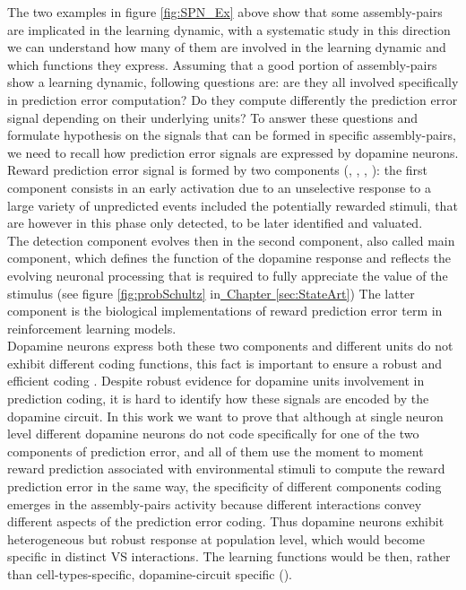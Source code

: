The two examples in figure \ref{fig:SPN_Ex} above show that some assembly-pairs are implicated in the learning dynamic, with a systematic study in this direction we can understand how many of them are involved in the learning dynamic and which functions they express. Assuming that a good portion of assembly-pairs show a learning dynamic, following questions are: are they all involved specifically in prediction error computation? Do they compute differently the prediction error signal depending on their underlying units? To answer these questions and formulate hypothesis on the signals that can be formed in specific assembly-pairs, we need to recall how prediction error signals are expressed by dopamine neurons. Reward prediction error signal is formed by two components (\cite{Tobler2003}, \cite{Nomoto2010}, \cite{Fiorillo2013}, \cite{Schultz2016}): the first component consists in an early activation due to an unselective response to a large variety of unpredicted events included the potentially rewarded stimuli, that are however in this phase only detected, to be later identified and valuated.\\The detection component evolves then in the second component, also called main component, which defines the function of the dopamine response and reflects the evolving neuronal processing that is required to fully appreciate the value of the stimulus (see figure \ref{fig:probSchultz} in\hyperref[sec:StateArt]{~Chapter \ref*{sec:StateArt}}) The latter component is the biological implementations of reward prediction error term in reinforcement learning models.\\
Dopamine neurons express both these two components and different units do not exhibit different coding functions, this fact is important to ensure a robust and efficient coding \cite{UchidaDop}. Despite robust evidence for dopamine units involvement in prediction coding, it is hard to identify how these signals are encoded by the dopamine circuit. In this work we want to prove that although at single neuron level different dopamine neurons do not code specifically for one of the two components of prediction error, and all of them use the moment to moment reward prediction associated with environmental stimuli to compute the reward prediction error in the same way, the specificity of different components coding emerges in the assembly-pairs activity because different interactions convey different aspects of the prediction error coding. Thus dopamine neurons exhibit heterogeneous but robust response at population level, which would become specific in distinct VS interactions. The learning functions would be then, rather than cell-types-specific, dopamine-circuit specific (\cite{Saunders2018}).\\
